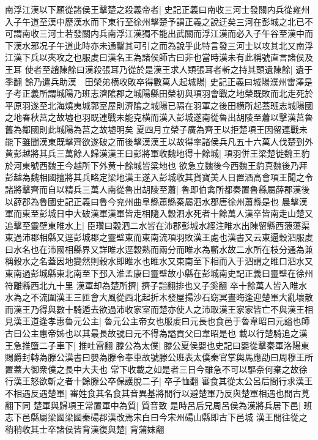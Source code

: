 南浮江漢以下願從諸侯王擊楚之殺義帝者|{
	史記正義曰南收三河士發關内兵從雍州入子午道至漢中歷漢水而下東行至徐州擊楚予謂正義之說迂矣三河在彭城之北已不可謂南收三河士若發關内兵南浮江漢獨不能出武關而浮江漢而必入子午谷至漢中而下漢水邪况子午道此時亦未通鑿其可引之而為說乎此特言發三河士以攻其北又南浮江漢下兵以夾攻之也服䖍曰漢名王為諸侯師古曰非也當時漢未有此稱號直言諸侯及王耳}
使者至趙陳餘曰漢殺張耳乃從於是漢王求人類張耳者斬之持其頭遺陳餘|{
	遺于季翻}
餘乃遣兵助漢　田榮弟横收敗卒得數萬人起城陽|{
	史記正義曰城陽濮州雷澤是子考正義所謂城陽乃班志濟隂郡之城陽縣田榮初與項羽會戰之地榮既敗而北走死於平原羽遂至北海燒夷城郭室屋則濟隂之城陽已隔在羽軍之後田横所起蓋班志城陽國之地春秋莒之故墟也羽既連戰未能克横而漢入彭城遂南從魯出胡陵至蕭以擊漢莒魯舊為鄰國則此城陽為莒之故墟明矣}
夏四月立榮子廣為齊王以拒楚項王因留連戰未能下雖聞漢東既擊齊欲遂破之而後擊漢漢王以故得率諸侯兵凡五十六萬人伐楚到外黄彭越將其兵三萬餘人歸漢漢王曰彭將軍收魏地得十餘城|{
	項羽併王梁楚徙魏王豹於河東號西魏王今越所下外黄十餘城皆梁地也}
欲急立魏後今西魏王豹真魏後乃拜彭越為魏相國擅將其兵略定梁地漢王遂入彭城收其貨寶美人日置酒高會項王聞之令諸將擊齊而自以精兵三萬人南從魯出胡陵至蕭|{
	魯即伯禽所都秦置魯縣屬薛郡漢後以薛郡為魯國史記正義曰魯今兖州曲阜縣蕭縣秦屬泗水郡唐徐州蕭縣是也}
晨擊漢軍而東至彭城日中大破漢軍漢軍皆走相隨入穀泗水死者十餘萬人漢卒皆南走山楚又追擊至靈壁東睢水上|{
	臣瓚曰穀泗二水皆在沛郡彭城水經注睢水出陳留縣西蒗蕩渠東過沛郡相縣又逕彭城郡之靈壁東而東南流項羽敗漢王處也漢書又云東逼穀泗服䖍曰水名也在沛國相縣界又詳睢水逕穀熟而兩分而睢水為蘄水故二水所在枝分通為兼稱穀水之名蓋因地變然則穀水即睢水也睢水又東南至下相而入于泗謂之睢口泗水又東南過彭城縣東北南至下邳入淮孟康曰靈壁故小縣在彭城南史記正義曰靈壁在徐州符離縣西北九十里}
漢軍却為楚所擠|{
	擠子詣翻排也又子奚翻}
卒十餘萬人皆入睢水水為之不流圍漢王三匝會大風從西北起折木發屋揚沙石窈冥晝晦逢迎楚軍大亂壞散而漢王乃得與數十騎遁去欲過沛收家室而楚亦使人之沛取漢王家家皆亡不與漢王相見漢王道逢孝惠魯元公主|{
	魯元公主帝女也服䖍曰元長也食邑于魯韋昭曰元謚也師古曰公主惠帝姊也以其最長故號曰元不得為謚貢父曰韋昭是也}
載以行楚騎追之漢王急推墮二子車下|{
	推吐雷翻}
滕公為太僕|{
	滕公夏侯嬰也史記曰嬰從擊秦軍洛陽東賜爵封轉為滕公漢書曰嬰為滕令奉車故號滕公班表太僕秦官掌輿馬應劭曰周穆王所置蓋大御衆僕之長中大夫也}
常下收載之如是者三日今雖急不可以驅奈何棄之故徐行漢王怒欲斬之者十餘滕公卒保護脫二子|{
	卒子恤翻}
審食其從太公呂后間行求漢王不相遇反遇楚軍|{
	審姓食其名食其音異基將間行以避楚軍乃反與楚軍相遇也間古莧翻下同}
楚軍與歸項王常置軍中為質|{
	質音致}
是時呂后兄周呂侯為漢將兵居下邑|{
	班志下邑縣屬梁國梁國秦碭郡漢改焉宋白曰今宋州碭山縣即古下邑城}
漢王間往從之稍稍收其士卒諸侯皆背漢復與楚|{
	背蒲妺翻}
